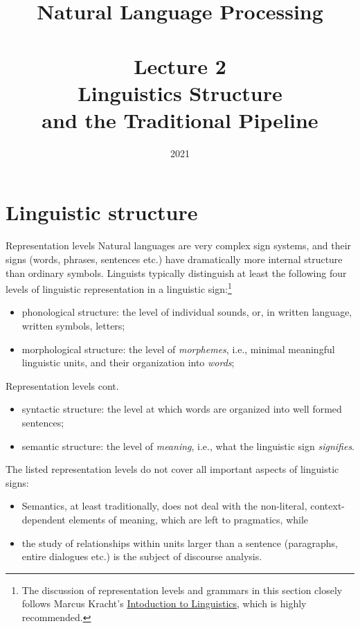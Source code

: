 \documentclass[style=upen, size=14pt]{powerdot}
\newcommand{\gold}{\color{arany}}
\begin{document}
\title{Natural Language Processing\\~~\\Lecture 2\\Linguistics Structure\\ and the
  Traditional Pipeline }

\date{2021}
\maketitle

\section[toc=Linguistic structure]{Linguistic structure}

\begin{slide}{Representation levels}
  Natural languages are very complex sign systems, and their signs (words,
  phrases, sentences etc.) have dramatically more internal structure than
  ordinary symbols. Linguists typically distinguish at least the following four
  levels of linguistic representation in a linguistic sign:\footnote{The
    discussion of representation levels and grammars in this section closely
    follows Marcus Kracht's
    \href{https://linguistics.ucla.edu/people/Kracht/courses/ling20-fall07/ling-intro.pdf}{Intoduction to Linguistics}, which is highly recommended.}
  \begin{itemize}
  \item {\gold phonological structure}: the level of individual sounds, or, in
    written language, written symbols, letters;
  \item {\gold morphological structure}: the level of \emph{morphemes}, i.e.,
    minimal  meaningful linguistic units, and their organization into \emph{words};
  \end{itemize}
\end{slide}

\begin{slide}[toc=]{Representation levels cont.}
  \begin{itemize}
  \item {\gold syntactic structure}: the level at which words are organized into
    well formed sentences;
  \item {\gold semantic structure}: the level of \emph{meaning}, i.e., what the
    linguistic sign \emph{signifies}.
  \end{itemize}
  The listed representation levels do not cover all important aspects of linguistic signs:
  \begin{itemize}
  \item Semantics, at least traditionally, does not deal with the non-literal,
    context-dependent elements of meaning, which are left to {\gold pragmatics},
    while
  \item the study of relationships within units larger than a sentence (paragraphs, entire
    dialogues etc.) is the subject of {\gold discourse analysis}.
  \end{itemize}
\end{slide}
\end{document}
